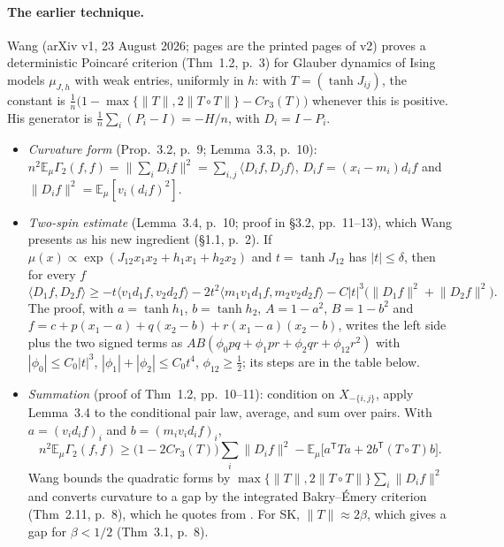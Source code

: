 \documentclass[11pt]{article}
\newcommand{\E}{\mathbb{E}}
\newcommand{\norm}[1]{\lVert #1\rVert}
\newcommand{\ip}[2]{\langle #1,#2\rangle}
\newcommand{\sloc}[2]{\cite[#2]{#1}}
\begin{document}
\paragraph{The earlier technique.}
Wang \cite{Wang2026-OptimalMixingGlauberSKBetaHalf} (arXiv v1, 23 August
2026; pages are the printed pages of v2) proves a deterministic Poincar\'e
criterion (Thm~1.2, p.~3) for Glauber dynamics of Ising models $\mu_{J,h}$ with
weak entries, uniformly in $h$: with $T=(\tanh J_{ij})$, the constant is
$\frac1n\bigl(1-\max\{\norm T,2\norm{T\circ T}\}-Cr_3(T)\bigr)$ whenever this
is positive. His generator is $\frac1n\sum_i(P_i-I)=-H/n$, with $D_i=I-P_i$.
\begin{itemize}
\item \emph{Curvature form} (Prop.~3.2, p.~9; Lemma~3.3, p.~10):
 $n^2\E_\mu\Gamma_2(f,f)=\norm{\sum_iD_if}^2=\sum_{i,j}\ip{D_if}{D_jf}$,
 $D_if=(x_i-m_i)d_if$ and $\norm{D_if}^2=\E_\mu[v_i(d_if)^2]$.
\item \emph{Two-spin estimate} (Lemma~3.4, p.~10; proof in \S3.2,
 pp.~11--13), which Wang presents as his new ingredient (\S1.1, p.~2). If
 $\mu(x)\propto\exp(J_{12}x_1x_2+h_1x_1+h_2x_2)$ and $t=\tanh J_{12}$ has
 $|t|\le\delta$, then for every $f$
 \[
 \ip{D_1f}{D_2f}\ge-t\ip{v_1d_1f}{v_2d_2f}
 -2t^2\ip{m_1v_1d_1f}{m_2v_2d_2f}-C|t|^3\bigl(\norm{D_1f}^2+\norm{D_2f}^2\bigr).
 \]
 The proof, with $a=\tanh h_1$, $b=\tanh h_2$, $A=1-a^2$, $B=1-b^2$ and
 $f=c+p(x_1-a)+q(x_2-b)+r(x_1-a)(x_2-b)$, writes the left side plus the two
 signed terms as $AB(\phi_0pq+\phi_1pr+\phi_2qr+\phi_{12}r^2)$ with
 $|\phi_0|\le C_0|t|^3$, $|\phi_1|+|\phi_2|\le C_0t^4$, $\phi_{12}\ge\frac12$;
 its steps are in the table below.
\item \emph{Summation} (proof of Thm~1.2, pp.~10--11): condition on
 $X_{-\{i,j\}}$, apply Lemma~3.4 to the conditional pair law, average, and sum
 over pairs. With $a=(v_id_if)_i$ and $b=(m_iv_id_if)_i$,
 \[
 n^2\E_\mu\Gamma_2(f,f)\ge\bigl(1-2Cr_3(T)\bigr)\sum_i\norm{D_if}^2
 -\E_\mu\bigl[a^{\mathsf T}Ta+2b^{\mathsf T}(T\circ T)b\bigr].
 \]
 Wang bounds the quadratic forms by
 $\max\{\norm T,2\norm{T\circ T}\}\sum_i\norm{D_if}^2$ and converts curvature
 to a gap by the integrated Bakry--\'Emery criterion (Thm~2.11, p.~8), which
 he quotes from \sloc{NL-BakryGentilLedoux2014}{Prop.~4.8.3}. For SK,
 $\norm T\approx2\beta$, which gives a gap for $\beta<1/2$ (Thm~3.1, p.~8).
\end{itemize}
\end{document}
